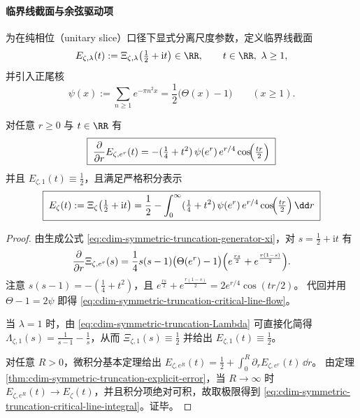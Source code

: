 \paragraph{临界线截面与余弦驱动项}
为在纯相位（unitary slice）口径下显式分离尺度参数，定义临界线截面
\[
E_{\zeta,\lambda}(t):=\Xi_{\zeta,\lambda}\!\left(\tfrac12+\mathrm{i}t\right)\in\RR,
\qquad t\in\RR,\ \lambda\ge 1,
\]
并引入正尾核
\[
\psi(x):=\sum_{n\ge 1}e^{-\pi n^2 x}=\frac12\bigl(\Theta(x)-1\bigr)\qquad(x\ge 1).
\]

\begin{proposition}[临界线截断的对数尺度流与余弦驱动项]\label{prop:cdim-symmetric-truncation-critical-line-flow}
对任意 \(r\ge 0\) 与 \(t\in\RR\) 有
\begin{equation}\label{eq:cdim-symmetric-truncation-critical-line-flow}
\boxed{\;
\frac{\partial}{\partial r}E_{\zeta,e^r}(t)
=-(\tfrac14+t^2)\,\psi(e^r)\,e^{r/4}\cos\!\Bigl(\tfrac{tr}{2}\Bigr)\;}
\end{equation}
并且 \(E_{\zeta,1}(t)\equiv \tfrac12\)，且满足严格积分表示
\begin{equation}\label{eq:cdim-symmetric-truncation-critical-line-integral}
\boxed{\;
E_\zeta(t):=\Xi_\zeta\!\left(\tfrac12+\mathrm{i}t\right)
=\frac12-\int_0^\infty (\tfrac14+t^2)\,\psi(e^r)\,e^{r/4}\cos\!\Bigl(\tfrac{tr}{2}\Bigr)\,\dd r\;}
\end{equation}
\end{proposition}

\begin{proof}
由生成公式 \eqref{eq:cdim-symmetric-truncation-generator-xi}，对 \(s=\tfrac12+\mathrm{i}t\) 有
\[
\frac{\partial}{\partial r}\Xi_{\zeta,e^r}(s)
=\frac14 s(s-1)\bigl(\Theta(e^r)-1\bigr)\Bigl(e^{\frac{rs}{2}}+e^{\frac{r(1-s)}{2}}\Bigr).
\]
注意 \(s(s-1)=-(\tfrac14+t^2)\)，且
\(
e^{\frac{rs}{2}}+e^{\frac{r(1-s)}{2}}
=2e^{r/4}\cos(tr/2)
\)。
代回并用 \(\Theta-1=2\psi\) 即得 \eqref{eq:cdim-symmetric-truncation-critical-line-flow}。
\par
当 \(\lambda=1\) 时，由 \eqref{eq:cdim-symmetric-truncation-Lambda} 可直接化简得
\(\Lambda_{\zeta,1}(s)=\frac{1}{s-1}-\frac{1}{s}\)，从而 \(\Xi_{\zeta,1}(s)\equiv \tfrac12\) 并给出 \(E_{\zeta,1}(t)\equiv\tfrac12\)。
\par
对任意 \(R>0\)，微积分基本定理给出
\(
E_{\zeta,e^R}(t)=\tfrac12+\int_0^R \partial_r E_{\zeta,e^r}(t)\,\dd r
\)。
由定理 \ref{thm:cdim-symmetric-truncation-explicit-error}，当 \(R\to\infty\) 时 \(E_{\zeta,e^R}(t)\to E_\zeta(t)\)，并且积分项绝对可积，故取极限得到 \eqref{eq:cdim-symmetric-truncation-critical-line-integral}。证毕。
\end{proof}


